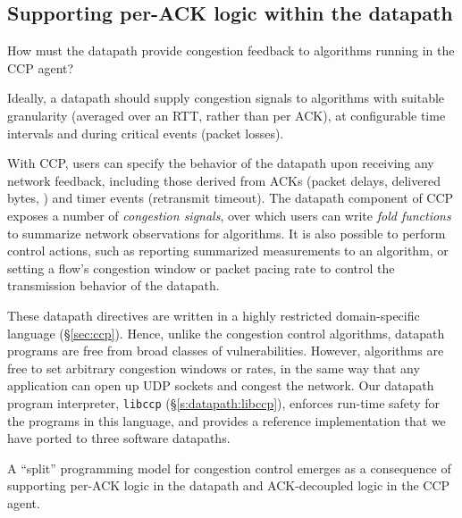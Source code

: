 \subsection{Supporting per-ACK logic within the datapath}
\label{sec:design:exercising-control-over-datapath}
\label{sec:design:restricted-datapath-functions}

How must the datapath provide congestion feedback to algorithms running in the CCP agent?

Ideally, a datapath should supply congestion signals to algorithms with suitable granularity (\eg averaged over an RTT, rather than per ACK), at configurable time intervals and during critical events (\eg packet losses).

With CCP, users can specify the behavior of the datapath upon receiving any network feedback, including those derived from ACKs (\eg packet delays, delivered bytes, \etc) and timer events (\eg retransmit timeout).
%
The datapath component of CCP exposes a number of {\em congestion signals}, over which users can write {\em fold functions} to summarize network observations for algorithms.
%
It is also possible to perform control actions, such as reporting summarized measurements to an algorithm, or setting a flow's congestion window or packet pacing rate to control the transmission behavior of the datapath.

These datapath directives are written in a highly restricted domain-specific language (\S\ref{sec:ccp}). Hence, unlike the congestion control algorithms, datapath programs are free from broad classes of vulnerabilities.
%
However, algorithms are free to set arbitrary congestion windows or rates, in the same way that any application can open up UDP sockets and congest the network.
%
Our datapath program interpreter, {\tt libccp} (\S\ref{s:datapath:libccp}), enforces run-time safety for the programs in this language, and provides a reference  implementation that we have ported to three software datapaths.

A ``split'' programming model for congestion control emerges as a consequence of supporting per-ACK logic in the datapath and ACK-decoupled logic in the CCP agent.
%


 
 
